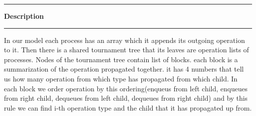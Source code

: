 \documentclass[10pt,table]{article}
\newcommand\question[1]{\vspace{1.2em}\hrule\textbf{ #1}\vspace{.5em}\hrule}
\theoremstyle{definition}
\begin{document}
\vspace{3em}
\begin{center}
\end{center}

\question{Description}

In our model each process has an array which it appends its outgoing operation to it. Then there is a shared tournament tree that its leaves are operation lists of processes. Nodes of the tournament tree contain list of blocks. each block is a summarization of the operation propagated together. it has 4 numbers that tell us how many operation from which type has propagated from which child. In each block we order operation by this ordering(enqueus from left child, enqueues from right child, dequeues from left child, dequeues from right child) and by this rule we can find i-th operation type and the child that it has propagated up from.
\end{document}
